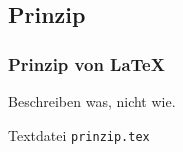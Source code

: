 \subsection{Prinzip}
\begin{frame}
	\frametitle{Prinzip von \LaTeX}
	Beschreiben was, nicht wie.
	\begin{block}{Textdatei {\tt prinzip.tex}}
	\end{block}
\end{frame}
